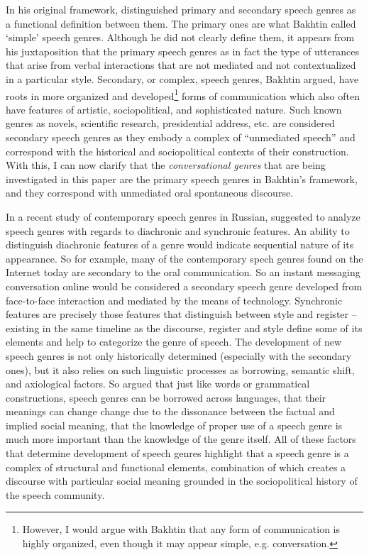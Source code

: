 \documentclass[12pt, draft]{article}
\begin{document}
In his original framework, \textcite{bakhtin1986} distinguished primary and secondary speech genres as a functional definition between them. The primary ones are what Bakhtin called `simple' speech genres. Although he did not clearly define them, it appears from his juxtaposition that the primary speech genres as in fact the type of utterances that arise from verbal interactions that are not mediated and not contextualized in a particular style. Secondary, or complex, speech genres, Bakhtin argued, have roots in more organized and developed\footnote{However, I would argue with Bakhtin that any form of communication is highly organized, even though it may appear simple, e.g. conversation.} forms of communication which also often have features of artistic, sociopolitical, and sophisticated nature. Such known genres as novels, scientific research, presidential address, etc. are considered secondary speech genres as they embody a complex of ``unmediated speech'' and correspond with the historical and sociopolitical contexts of their construction. With this, I can now clarify that the \textit{conversational genres} that are being investigated in this paper are the primary speech genres in Bakhtin's framework, and they correspond with unmediated oral spontaneous discourse.

In a recent study of contemporary speech genres in Russian, \textcite{dementyev2015} suggested to analyze speech genres with regards to diachronic and synchronic features. An ability to distinguish diachronic features of a genre would indicate sequential nature of its appearance. So for example, many of the contemporary spech genres found on the Internet today are secondary to the oral communication. So an instant messaging conversation online would be considered a secondary speech genre developed from face-to-face interaction and mediated by the means of technology. Synchronic features are precisely those features that distinguish between style and register -- existing in the same timeline as the discourse, register and style define some of its elements and help to categorize the genre of speech. The development of new speech genres is not only historically determined (especially with the secondary ones), but it also relies on such linguistic processes as borrowing, semantic shift, and axiological factors. So \textcite[p. 81-82]{dementyev2015} argued that just like words or grammatical constructions, speech genres can be borrowed across languages, that their meanings can change change due to the dissonance between the factual and implied social meaning, that the knowledge of proper use of a speech genre is much more important than the knowledge of the genre itself. All of these factors that determine development of speech genres highlight that a speech genre is a complex of structural and functional elements, combination of which creates a discourse with particular social meaning grounded in the sociopolitical history of the speech community. 
\end{document}
